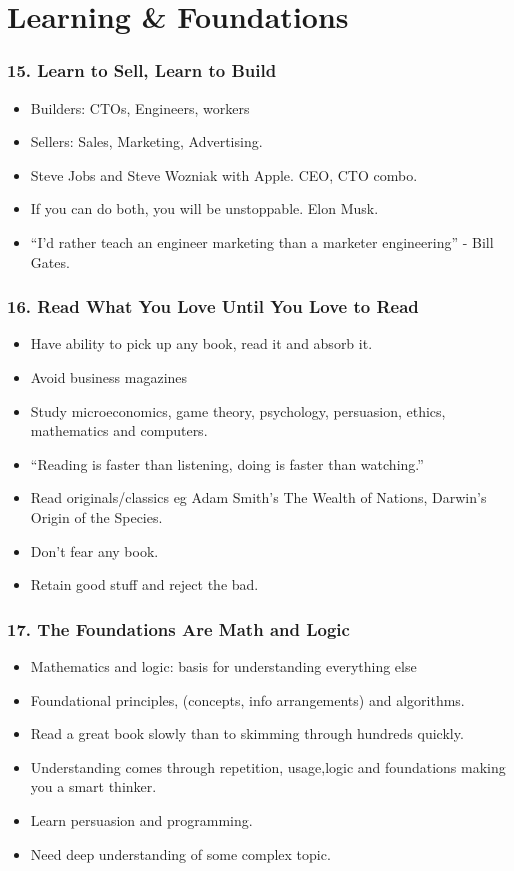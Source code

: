 \section{Learning \& Foundations}

\begin{frame}[fragile]
\frametitle{15. Learn to Sell, Learn to Build}
\begin{itemize}
\item Builders: CTOs, Engineers, workers
\item Sellers: Sales, Marketing, Advertising.
\item Steve Jobs and Steve Wozniak with Apple. CEO, CTO combo.
\item If you can do both, you will be unstoppable. Elon Musk.
\item ``I'd rather teach an engineer marketing than a marketer engineering'' - Bill Gates.
\end{itemize}
\end{frame}

\begin{frame}[fragile]
\frametitle{16. Read What You Love Until You Love to Read}
\begin{itemize}
\item Have ability to pick up any book, read it and absorb it.
\item Avoid business magazines
\item Study microeconomics, game theory, psychology, persuasion, ethics, mathematics and computers.
\item ``Reading is faster than listening, doing is faster than watching.''
\item Read originals/classics eg Adam Smith's The Wealth of Nations, Darwin's Origin of the Species.
\item Don't fear any book. 
\item Retain good stuff and reject the bad.
\end{itemize}
\end{frame}

\begin{frame}[fragile]
\frametitle{17. The Foundations Are Math and Logic}
\begin{itemize}
\item Mathematics and logic:  basis for understanding everything else
\item Foundational principles, (concepts, info arrangements) and algorithms.
\item Read a great book slowly than to skimming through hundreds quickly.
\item Understanding comes through repetition, usage,logic and foundations making you a smart thinker.
\item Learn persuasion and programming.
\item Need deep understanding of some complex topic.
\end{itemize}
\end{frame}


